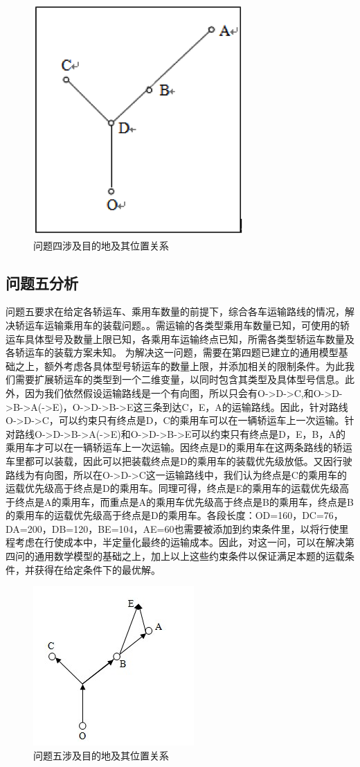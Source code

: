 \documentclass[UTF8]{ctexart}
\begin{document}
\begin{figure}[h!]
	\centering
	\includegraphics[width=0.3\linewidth]{figure/Q4.png}
	\caption{问题四涉及目的地及其位置关系}
\end{figure}

\subsection{问题五分析}
问题五要求在给定各轿运车、乘用车数量的前提下，综合各车运输路线的情况，解决轿运车运输乘用车的装载问题。。需运输的各类型乘用车数量已知，可使用的轿运车具体型号及数量上限已知，各乘用车运输终点已知，所需各类型轿运车数量及各轿运车的装载方案未知。
为解决这一问题，需要在第四题已建立的通用模型基础之上，额外考虑各具体型号轿运车的数量上限，并添加相关的限制条件。为此我们需要扩展轿运车的类型到一个二维变量，以同时包含其类型及具体型号信息。此外，因为我们依然假设运输路线是一个有向图，所以只会有O->D->C,和O->D->B->A(->E)，O->D->B->E这三条到达C，E，A的运输路线。因此，针对路线O->D->C，可以约束只有终点是D，C的乘用车可以在一辆轿运车上一次运输。针对路线O->D->B->A(->E)和O->D->B->E可以约束只有终点是D，E，B，A的乘用车才可以在一辆轿运车上一次运输。因终点是D的乘用车在这两条路线的轿运车里都可以装载，因此可以把装载终点是D的乘用车的装载优先级放低。又因行驶路线为有向图，所以在O->D->C这一运输路线中，我们认为终点是C的乘用车的运载优先级高于终点是D的乘用车。同理可得，终点是E的乘用车的运载优先级高于终点是A的乘用车，而重点是A的乘用车优先级高于终点是B的乘用车，终点是B的乘用车的运载优先级高于终点是D的乘用车。各段长度：OD=160，DC=76，DA=200，DB=120，BE=104，AE=60也需要被添加到约束条件里，以将行使里程考虑在行使成本中，半定量化最终的运输成本。因此，对这一问，可以在解决第四问的通用数学模型的基础之上，加上以上这些约束条件以保证满足本题的运载条件，并获得在给定条件下的最优解。

\begin{figure}[h!]
	\centering
	\includegraphics[width=0.3\linewidth]{figure/Q5.png}
	\caption{问题五涉及目的地及其位置关系}
\end{figure}
\end{document}
